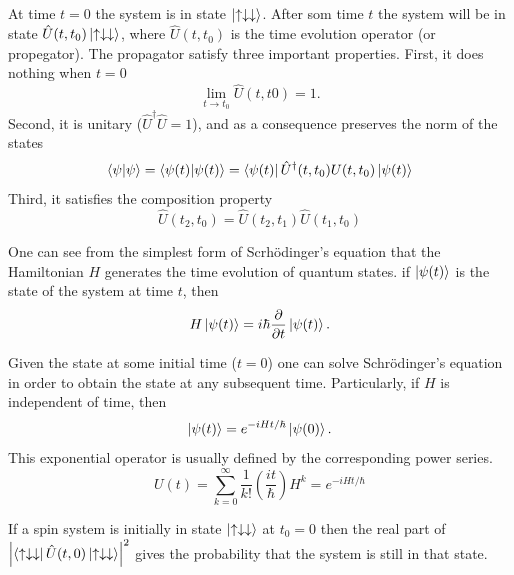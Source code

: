 \documentclass{article}
\begin{document}
\subsection{}
At time $t=0$ the system is in state $\ket{\uparrow\downarrow\downarrow}$. After som time $t$ the system will be in state $\hat{U}(t,t_0)\ket{\uparrow\downarrow\downarrow}$, where $\hat{U}(t,t_0)$ is the time evolution operator (or propegator). The propagator satisfy three important properties. First, it does nothing when $t=0$
\begin{equation}
\lim_{t\to t_0}\hat{U}(t,t0)=1.
\end{equation}
Second, it is unitary ($\hat{U}^{\dagger}\hat{U}=1$), and as a consequence preserves the norm of the states
\begin{equation}
\braket{\psi} = \braket{\psi(t)} = \bra{\psi(t)} \hat{U}^{\dagger}(t,t_0){U}(t,t_0) \ket{\psi(t)}
\end{equation}
Third, it satisfies the composition property
\begin{equation}
\hat{U}(t_2,t_0)=\hat{U}(t_2,t_1)\hat{U}(t_1,t_0)
\end{equation}

One can see from the simplest form of Scrhödinger's equation that the Hamiltonian $H$ generates the time evolution of quantum states. if $\ket{\psi(t)}$ is the state of the system at time $t$, then
\begin{equation}
H\ket{\psi(t)}=i\hbar\frac{\partial}{\partial t}\ket{\psi(t)}.
\end{equation}

Given the state at some initial time ($t=0$) one can solve Schrödinger's equation in order to obtain the state at any subsequent time. Particularly, if $H$ is independent of time, then
\begin{equation}
\ket{\psi(t)}=e^{-iHt/\hbar}\ket{\psi(0)}.
\end{equation}
This exponential operator is usually defined by the corresponding power series. 
\begin{equation}
U(t) = \sum_{k=0}^{\infty}\frac{1}{k!}\left(\frac{it}{\hbar} \right)H^k = e^{-iHt/\hbar}
\end{equation}

If a spin system is initially in state $\ket{\uparrow\downarrow\downarrow}$ at $t_0=0$ then the real part of $\abs{\bra{\uparrow\downarrow\downarrow}\hat{U}(t,0) \ket{\uparrow\downarrow\downarrow}}^2$ gives the probability that the system is still in that state.
\end{document}
